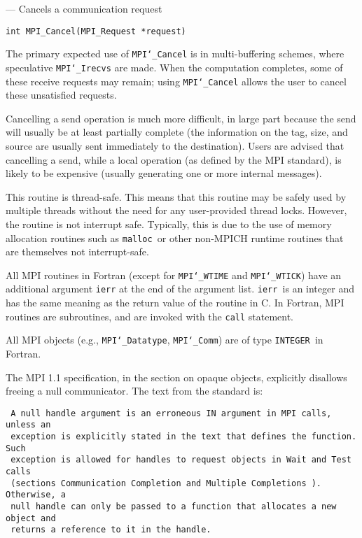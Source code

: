 \startmanpage
{}
--- Cancels a communication request 
\startvb\begin{verbatim}
int MPI_Cancel(MPI_Request *request)

\end{verbatim}
\endvb

\par
{}
The primary expected use of {\tt MPI{\tt \char`\_}Cancel} is in multi-buffering
schemes, where speculative {\tt MPI{\tt \char`\_}Irecvs} are made.  When the computation
completes, some of these receive requests may remain; using {\tt MPI{\tt \char`\_}Cancel} allows
the user to cancel these unsatisfied requests.
\par
Cancelling a send operation is much more difficult, in large part because the
send will usually be at least partially complete (the information on the tag,
size, and source are usually sent immediately to the destination).
Users are
advised that cancelling a send, while a local operation (as defined by the MPI
standard), is likely to be expensive (usually generating one or more internal
messages).
\par
{}
\par
This routine is thread-safe.  This means that this routine may be
safely used by multiple threads without the need for any user-provided
thread locks.  However, the routine is not interrupt safe.  Typically,
this is due to the use of memory allocation routines such as {\tt malloc
}or other non-MPICH runtime routines that are themselves not interrupt-safe.
\par
{}
All MPI routines in Fortran (except for {\tt MPI{\tt \char`\_}WTIME} and {\tt MPI{\tt \char`\_}WTICK}) have
an additional argument {\tt ierr} at the end of the argument list.  {\tt ierr
}is an integer and has the same meaning as the return value of the routine
in C.  In Fortran, MPI routines are subroutines, and are invoked with the
{\tt call} statement.
\par
All MPI objects (e.g., {\tt MPI{\tt \char`\_}Datatype}, {\tt MPI{\tt \char`\_}Comm}) are of type {\tt INTEGER
}in Fortran.
\par
{}
The MPI 1.1 specification, in the section on opaque objects, explicitly
disallows freeing a null communicator.  The text from the standard is:
\begin{verbatim}
 A null handle argument is an erroneous IN argument in MPI calls, unless an
 exception is explicitly stated in the text that defines the function. Such
 exception is allowed for handles to request objects in Wait and Test calls
 (sections Communication Completion and Multiple Completions ). Otherwise, a
 null handle can only be passed to a function that allocates a new object and
 returns a reference to it in the handle.
\end{verbatim}

